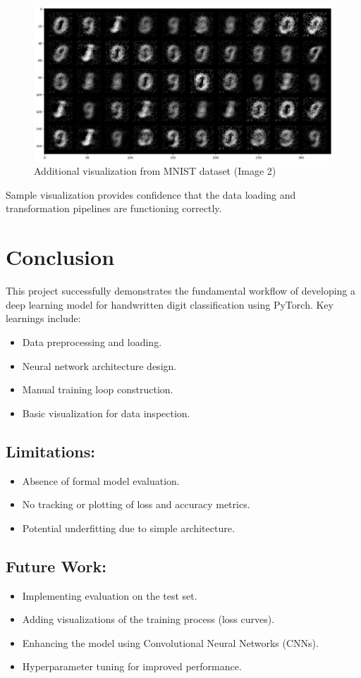 \documentclass{article}
\begin{document}
\begin{figure}[h!]
    \centering
    \includegraphics[width=0.7\linewidth]{output2.png}
    \caption{Additional visualization from MNIST dataset (Image 2)}
    \label{fig:mnist_sample2}
\end{figure}

Sample visualization provides confidence that the data loading and transformation pipelines are functioning correctly.

\section{Conclusion}
This project successfully demonstrates the fundamental workflow of developing a deep learning model for handwritten digit classification using PyTorch. Key learnings include:
\begin{itemize}
    \item Data preprocessing and loading.
    \item Neural network architecture design.
    \item Manual training loop construction.
    \item Basic visualization for data inspection.
\end{itemize}

\subsection*{Limitations:}
\begin{itemize}
    \item Absence of formal model evaluation.
    \item No tracking or plotting of loss and accuracy metrics.
    \item Potential underfitting due to simple architecture.
\end{itemize}

\subsection*{Future Work:}
\begin{itemize}
    \item Implementing evaluation on the test set.
    \item Adding visualizations of the training process (loss curves).
    \item Enhancing the model using Convolutional Neural Networks (CNNs).
    \item Hyperparameter tuning for improved performance.
\end{itemize}
\end{document}
